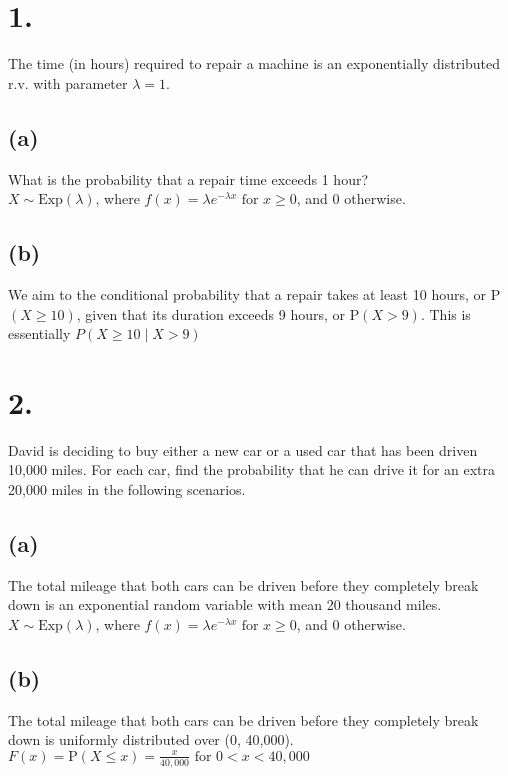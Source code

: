 \documentclass{article}
\begin{document}
\thispagestyle{firstpageheader}

\section*{1.}
{\Large 

The time (in hours) required to repair a machine is an exponentially distributed r.v. with
parameter $\lambda = 1$.

\subsection*{(a)}
What is the probability that a repair time exceeds 1 hour? \\
$X \sim \text{Exp}(\lambda)$, where $f(x) = \lambda e^{-\lambda x} \text{ for } x \geq 0$, and 0 otherwise.

\subsection*{(b)}
We aim to the conditional probability that a repair takes at least 10 hours, or P$(X \geq 10)$, given that its duration
exceeds 9 hours, or P$(X > 9)$. This is essentially $P(X \geq 10 \mid X > 9)$ 

}

\section*{2.}
{\Large

David is deciding to buy either a new car or a used car that has been driven 10,000 miles. For
each car, find the probability that he can drive it for an extra 20,000 miles in the following
scenarios.

\subsection*{(a)}
The total mileage that both cars can be driven before they completely break down is an
exponential random variable with mean 20 thousand miles. \\
$X \sim \text{Exp}(\lambda)$, where $f(x) = \lambda e^{-\lambda x} \text{ for } x \geq 0$, and 0 otherwise.


\subsection*{(b)}
The total mileage that both cars can be driven before they completely break down is
uniformly distributed over (0, 40,000). \\
$F(x) = \text{P}(X \leq x) = \frac{x}{40,000} \text{ for } 0 < x < 40,000$ 

}
\end{document}
